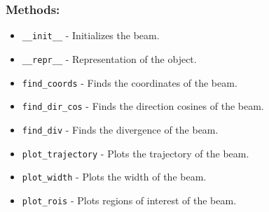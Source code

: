 \documentclass{article}
\begin{document}
\subsubsection*{Methods:}
\begin{itemize}
    \item \texttt{\_\_init\_\_} - Initializes the beam.
    \item \texttt{\_\_repr\_\_} - Representation of the object.
    \item \texttt{find\_coords} - Finds the coordinates of the beam.
    \item \texttt{find\_dir\_cos} - Finds the direction cosines of the beam.
    \item \texttt{find\_div} - Finds the divergence of the beam.
    \item \texttt{plot\_trajectory} - Plots the trajectory of the beam.
    \item \texttt{plot\_width} - Plots the width of the beam.
    \item \texttt{plot\_rois} - Plots regions of interest of the beam.
\end{itemize}
\end{document}
